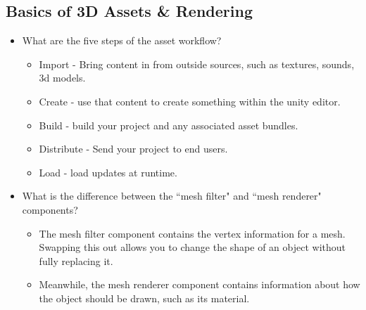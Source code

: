 \documentclass{article}
\begin{document}
\subsection{Basics of 3D Assets \& Rendering}
\begin{itemize}
    \item What are the five steps of the asset workflow?
    \begin{itemize}
        \item Import - Bring content in from outside sources, such as textures, sounds, 3d models.
        \item Create - use that content to create something within the unity editor.
        \item Build - build your project and any associated asset bundles.
        \item Distribute - Send your project to end users.
        \item Load - load updates at runtime.
    \end{itemize}
    \item What is the difference between the ``mesh filter" and ``mesh renderer" components?
    \begin{itemize}
        \item The mesh filter component contains the vertex information for a mesh. Swapping this out allows you to change the shape of an object without fully replacing it.
        \item Meanwhile, the mesh renderer component contains information about how the object should be drawn, such as its material.
    \end{itemize}
\end{itemize}
\end{document}

